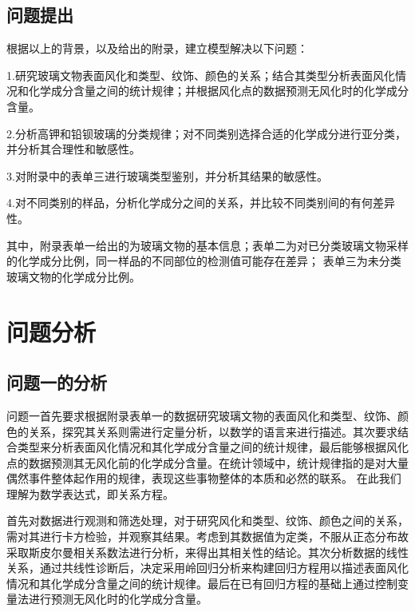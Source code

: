 \documentclass[UTF8]{ctexart}
\begin{document}
            \subsection{问题提出}
            根据以上的背景，以及给出的附录，建立模型解决以下问题：

            1.研究玻璃文物表面风化和类型、纹饰、颜色的关系；结合其类型分析表面风化情况和化学成分含量之间的统计规律；并根据风化点的数据预测无风化时的化学成分含量。

            2.分析高钾和铅钡玻璃的分类规律；对不同类别选择合适的化学成分进行亚分类，并分析其合理性和敏感性。

            3.对附录中的表单三进行玻璃类型鉴别，并分析其结果的敏感性。

            4.对不同类别的样品，分析化学成分之间的关系，并比较不同类别间的有何差异性。


            其中，附录表单一给出的为玻璃文物的基本信息；表单二为对已分类玻璃文物采样的化学成分比例，同一样品的不同部位的检测值可能存在差异；
            表单三为未分类玻璃文物的化学成分比例。



            \section{问题分析}
            \subsection{问题一的分析}
            问题一首先要求根据附录表单一的数据研究玻璃文物的表面风化和类型、纹饰、颜色的关系，探究其关系则需进行定量分析，以数学的语言来进行描述。其次要求结合类型来分析表面风化情况和其化学成分含量之间的统计规律，最后能够根据风化点的数据预测其无风化前的化学成分含量。在统计领域中，统计规律指的是对大量偶然事件整体起作用的规律，表现这些事物整体的本质和必然的联系。
            在此我们理解为数学表达式，即关系方程。

            首先对数据进行观测和筛选处理，对于研究风化和类型、纹饰、颜色之间的关系，需对其进行卡方检验，并观察其结果。考虑到其数据值为定类，不服从正态分布故采取斯皮尔曼相关系数法进行分析，来得出其相关性的结论。其次分析数据的线性关系，通过共线性诊断后，决定采用岭回归分析来构建回归方程用以描述表面风化情况和其化学成分含量之间的统计规律。最后在已有回归方程的基础上通过控制变量法进行预测无风化时的化学成分含量。
\end{document}
